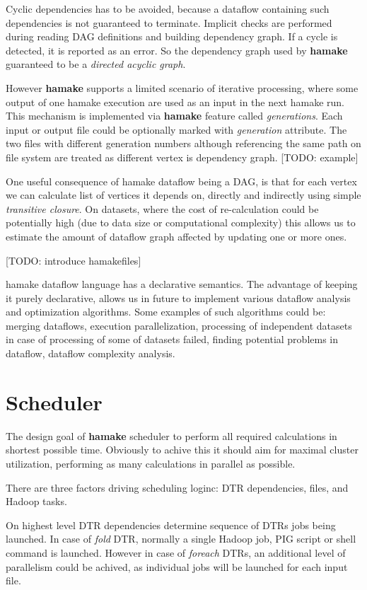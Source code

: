 \documentclass[11pt,twocolumn]{article}
\begin{document}
Cyclic dependencies has to be avoided, because a dataflow containing
such dependencies is not guaranteed to terminate. Implicit checks are
performed during reading DAG definitions and building dependency
graph. If a cycle is detected, it is reported as an error. So the
dependency graph used by \textbf{hamake} guaranteed to be a
\textit{directed acyclic graph}.

However \textbf{hamake} supports a limited scenario of iterative
processing, where some output of one hamake execution are used as an
input in the next hamake run. This mechanism is implemented via
\textbf{hamake} feature called \textit{generations}. Each input or
output file could be optionally marked with \emph{generation}
attribute. The two files with different generation numbers although
referencing the same path on file system are treated as different
vertex is dependency graph. [TODO: example]

One useful consequence of hamake dataflow being a DAG, is that for
each vertex we can calculate list of vertices it depends on, directly
and indirectly using simple \textit{transitive closure}. On datasets,
where the cost of re-calculation could be potentially high (due to
data size or computational complexity) this allows us to estimate the
amount of dataflow graph affected by updating one or more ones.

[TODO: introduce hamakefiles]

hamake dataflow language has a declarative semantics. The advantage of
keeping it purely declarative, allows us in future to implement
various dataflow analysis and optimization algorithms. Some examples
of such algorithms could be: merging dataflows, execution
parallelization, processing of independent datasets in case of
processing of some of datasets failed, finding potential problems in
dataflow, dataflow complexity analysis.

\section{Scheduler}

The design goal of \textbf{hamake} scheduler to perform all required
calculations in shortest possible time. Obviously to achive this it
should aim for maximal cluster utilization, performing as many
calculations in parallel as possible.

There are three factors driving scheduling loginc: DTR dependencies,
files, and Hadoop tasks.

On highest level DTR dependencies determine sequence of DTRs jobs
being launched. In case of \emph{fold} DTR, normally a single Hadoop
job, PIG script or shell command is launched. However in case of
\emph{foreach} DTRs, an additional level of parallelism could be
achived, as individual jobs will be launched for each input file.
\end{document}
